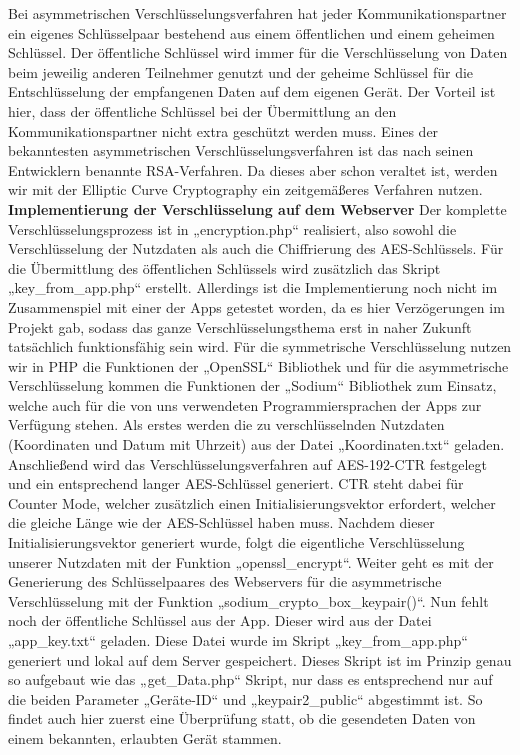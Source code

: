 Bei asymmetrischen Verschlüsselungsverfahren hat jeder Kommunikationspartner ein eigenes Schlüsselpaar bestehend aus einem öffentlichen und einem geheimen Schlüssel. Der öffentliche Schlüssel wird immer für die Verschlüsselung von Daten beim jeweilig anderen Teilnehmer genutzt und der geheime Schlüssel für die Entschlüsselung der empfangenen Daten auf dem eigenen Gerät. Der Vorteil ist hier, dass der öffentliche Schlüssel bei der Übermittlung an den Kommunikationspartner nicht extra geschützt werden muss. Eines der bekanntesten asymmetrischen Verschlüsselungsverfahren ist das nach seinen Entwicklern benannte RSA-Verfahren. Da dieses aber schon veraltet ist, werden wir mit der Elliptic Curve Cryptography ein zeitgemäßeres Verfahren nutzen.
\\
\textbf{Implementierung der Verschlüsselung auf dem Webserver }Der komplette Verschlüsselungsprozess ist in „encryption.php“ realisiert, also sowohl die Verschlüsselung der Nutzdaten als auch die Chiffrierung des AES-Schlüssels. Für die Übermittlung des öffentlichen Schlüssels wird zusätzlich das Skript „key\_from\_app.php“ erstellt. Allerdings ist die Implementierung noch nicht im Zusammenspiel mit einer der Apps getestet worden, da es hier Verzögerungen im Projekt gab, sodass das ganze Verschlüsselungsthema erst in naher Zukunft tatsächlich funktionsfähig sein wird. Für die symmetrische Verschlüsselung nutzen wir in PHP die Funktionen der „OpenSSL“ Bibliothek und für die asymmetrische Verschlüsselung kommen die Funktionen der „Sodium“ Bibliothek zum Einsatz, welche auch für die von uns verwendeten Programmiersprachen der Apps zur Verfügung stehen.
Als erstes werden die zu verschlüsselnden Nutzdaten (Koordinaten und Datum mit Uhrzeit) aus der Datei „Koordinaten.txt“ geladen. Anschließend wird das Verschlüsselungsverfahren auf AES-192-CTR festgelegt und ein entsprechend langer AES-Schlüssel generiert. CTR steht dabei für Counter Mode, welcher zusätzlich einen Initialisierungsvektor erfordert, welcher die gleiche Länge wie der AES-Schlüssel haben muss. Nachdem dieser Initialisierungsvektor generiert wurde, folgt die eigentliche Verschlüsselung unserer Nutzdaten mit der Funktion „openssl\_encrypt“. Weiter geht es mit der Generierung des Schlüsselpaares des Webservers für die asymmetrische Verschlüsselung mit der Funktion „sodium\_crypto\_box\_keypair()“.
Nun fehlt noch der öffentliche Schlüssel aus der App. Dieser wird aus der Datei „app\_key.txt“ geladen. Diese Datei wurde im Skript „key\_from\_app.php“ generiert und lokal auf dem Server gespeichert. Dieses Skript ist im Prinzip genau so aufgebaut wie das „get\_Data.php“ Skript, nur dass es entsprechend nur auf die beiden Parameter „Geräte-ID“ und „keypair2\_public“ abgestimmt ist. So findet auch hier zuerst eine Überprüfung statt, ob die gesendeten Daten von einem bekannten, erlaubten Gerät stammen.
